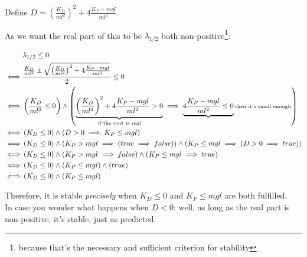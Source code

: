 \documentclass[a4paper,parskip,headheight=38pt]{scrartcl} %
\begin{document}
Define $D = \left(\frac{K_D}{ml^2}\right)^2 + 4\frac{K_P - mgl}{ml^2}$.

As we want the real part of this to be $\lambda_{1/2}$ both
non-positive\footnote{because that's the necessary and sufficient
criterion for stability}:

\begin{align*}
& \lambda_{1/2} \leq 0 \\
\iff& \frac{\frac{K_D}{ml^2} \pm \sqrt{\left(\frac{K_D}{ml^2}\right)^2 + 4\frac{K_P - mgl}{ml^2}}}{2} \leq 0 \\
\iff & \left( \frac{K_D}{ml^2} \leq 0 \right) \land \left( \underbrace{\left(\frac{K_D}{ml^2}\right)^2 + 4\frac{K_P - mgl}{ml^2} > 0}_\text{\scriptsize if the root is real} \implies \underbrace{4\frac{K_P - mgl}{ml^2} \le 0}\text{\scriptsize then it's small enough} \right) \\
\iff & \left( K_D \leq 0 \right) \land \left( D > 0 \implies K_P \le mgl \right) \\
\iff & \left( K_D \leq 0 \right) \land \left( K_P > mgl \implies ( true \implies false ) \right) \land \left( K_P \le mgl \implies ( D > 0 \implies true ) \right) \\
\iff & \left( K_D \leq 0 \right) \land \left( K_P > mgl \implies false \right) \land \left( K_P \le mgl \implies true \right) \\
\iff & \left( K_D \leq 0 \right) \land \left( K_P \leq mgl \right) \land \left( true \right) \\
\iff & \left( K_D \leq 0 \right) \land \left( K_P \leq mgl \right)
\end{align*}

Therefore, it is stable \emph{precisely} when $K_D \leq 0$ and $K_P
\leq mgl$ are both fulfilled.
 \\
In case you wonder what happens when $D<0$: well, as long as the real
part is non-positive, it's stable, just as predicted.
\end{document}
